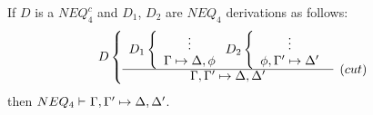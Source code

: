 
\begin{LEMMA}\label{le:elcut}
If $D$ is a $NEQ_4^c$ and $D_1$, $D_2$ are $NEQ_4$ derivations as follows:
\[ D\left\{ \begin{array}{cl}
 D_1\left\{ \begin{array}{c}
  \vdots \\   \Gamma\Seq\Delta, \phi
 \end{array} \right.
 D_2\left\{ \begin{array}{c}
  \vdots \\   \phi, \Gamma'\Seq\Delta'
 \end{array} \right. \\ \cline{1-1}
\Gamma,\Gamma' \Seq \Delta,\Delta'
&   \raisebox{1.2ex}[1.5ex][0ex]{$(cut)$}
\end{array}\right. \]
then ${NEQ_4}\vdash^{{}}\Gamma,\Gamma'\mathrel{\mapsto}\Delta,\Delta'$.
\end{LEMMA}
